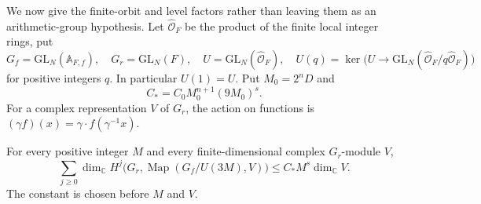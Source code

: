 We now give the finite-orbit and level factors rather than leaving
them as an arithmetic-group hypothesis.
Let \(\widehat{\mathcal O}_F\) be the product of the finite local
integer rings, put
\[
 G_f=\mathrm{GL}_N(\mathbb A_{F,f}),\quad
 G_r=\mathrm{GL}_N(F),\quad
 U=\mathrm{GL}_N(\widehat{\mathcal O}_F),\quad
 U(q)=\ker\bigl(U\longrightarrow
        \mathrm{GL}_N(\widehat{\mathcal O}_F/q\widehat{\mathcal O}_F)\bigr)
\]
for positive integers \(q\).
In particular \(U(1)=U\).
Put \(M_0=2^nD\) and
\[
                  C_*=C_0 M_0^{n+1}(9M_0)^s.
\]
For a complex representation \(V\) of \(G_r\), the action on
functions is
\((\gamma f)(x)=\gamma\cdot f(\gamma^{-1}x)\).

\begin{srproposition}\label{prop:sr-level-cohomology}
For every positive integer \(M\) and every finite-dimensional
complex \(G_r\)-module \(V\),
\begin{equation}\label{eq:sr-level-cohomology}
 \sum_{j\geq0}\dim_{\mathbb C}
 H^j\bigl(G_r,\operatorname{Map}(G_f/U(3M),V)\bigr)
                                   \leq C_* M^s\dim_{\mathbb C}V.
\end{equation}
The constant is chosen before \(M\) and \(V\).
\end{srproposition}

